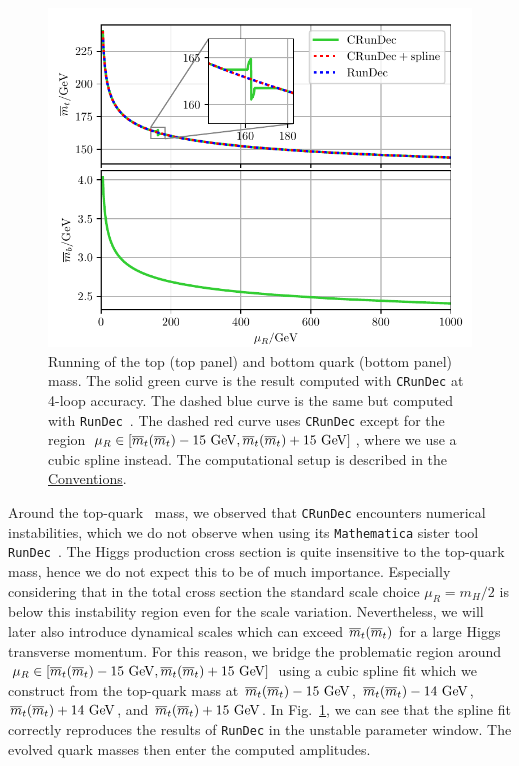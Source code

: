 \begin{figure}[ht]
\centering
\includegraphics[width=\figurewidth]{Images/mass_running.pdf}
\caption{Running of the top (top panel) and bottom quark (bottom panel) mass. The solid green curve is the result computed with \texttt{CRunDec} at 4-loop accuracy. The dashed blue curve is the same but computed with \texttt{RunDec}~\cite{Chetyrkin:2000yt}. The dashed red curve uses \texttt{CRunDec} except for the region $\mu_R \in [\msMass{t}-15 \ \mathrm{GeV}, \msMass{t} + 15 \ \mathrm{GeV}]$, where we use a cubic spline instead. The computational setup is described in the \hyperref[chap:notation_and_conventions]{Conventions}.}
\label{fig:5:running}
\end{figure}
Around the top-quark \MS\ mass, we observed that \texttt{CRunDec} encounters numerical instabilities, which we do not observe when using its \texttt{Mathematica} sister tool \texttt{RunDec}~\cite{Chetyrkin:2000yt}. The Higgs production cross section is quite insensitive to the top-quark mass, hence we do not expect this to be of much importance. Especially considering that in the total cross section the standard scale choice $\mu_R = m_H/2$ is below this instability region even for the scale variation. Nevertheless, we will later also introduce dynamical scales which can exceed $\overline{m}_{t}\!\left(\overline{m}_{t} \right)$ for a large Higgs transverse momentum. For this reason, we bridge the problematic region around $\mu_R \in [\msMass{t} - 15 \ \mathrm{GeV}, \msMass{t} + 15\ \mathrm{GeV}]$ using a cubic spline fit which we construct from the top-quark mass at $\overline{m}_{t}\!\left(\overline{m}_{t} \right) - 15 \ \mathrm{GeV}$, $\overline{m}_{t}\!\left(\overline{m}_{t} \right) - 14 \ \mathrm{GeV}$,$\overline{m}_{t}\!\left(\overline{m}_{t} \right) + 14 \ \mathrm{GeV}$, and $\overline{m}_{t}\!\left(\overline{m}_{t} \right) + 15 \ \mathrm{GeV}$. In Fig.~\ref{fig:5:running}, we can see that the spline fit correctly reproduces the results of \texttt{RunDec} in the unstable parameter window. The evolved quark masses then enter the computed amplitudes.

